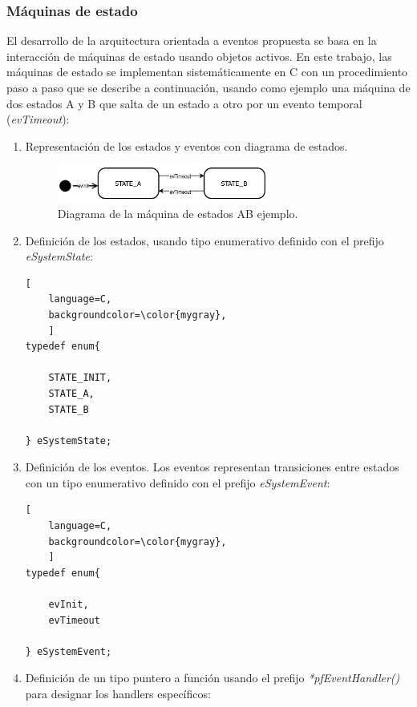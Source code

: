 \subsubsection{Máquinas de estado}
El desarrollo de la arquitectura orientada a eventos propuesta se basa en la interacción de máquinas de estado usando objetos activos. En este trabajo, las máquinas de estado se implementan sistemáticamente en C con un procedimiento paso a paso que se describe a continuación, usando como ejemplo una máquina de dos estados A y B que salta de un estado a otro por un evento temporal (\textit{evTimeout}):

\begin{enumerate}
\item Representación de los estados y eventos con diagrama de estados.
\begin{figure}[ht]
	\centering
	\includegraphics[width=0.66\textwidth]{./Figures/statemachineAB.png}
	\caption{Diagrama de la máquina de estados AB ejemplo.}
	\label{fig:fsmAB}
\end{figure}

\item Definición de los estados, usando tipo enumerativo definido con el prefijo \textit{eSystemState}:

\begin{lstlisting}[
	language=C, 
	backgroundcolor=\color{mygray},
	]
typedef enum{
    
    STATE_INIT,
	STATE_A,
	STATE_B

} eSystemState;
\end{lstlisting}

\item Definición de los eventos. Los eventos representan transiciones entre estados con un tipo enumerativo definido con el prefijo \textit{eSystemEvent}:

\begin{lstlisting}[
	language=C, 
	backgroundcolor=\color{mygray},
	]
typedef enum{

	evInit,
	evTimeout

} eSystemEvent;
\end{lstlisting}

\item Definición de un tipo puntero a función usando el prefijo \textit{*pfEventHandler()} para designar los handlers específicos:


\end{enumerate}
